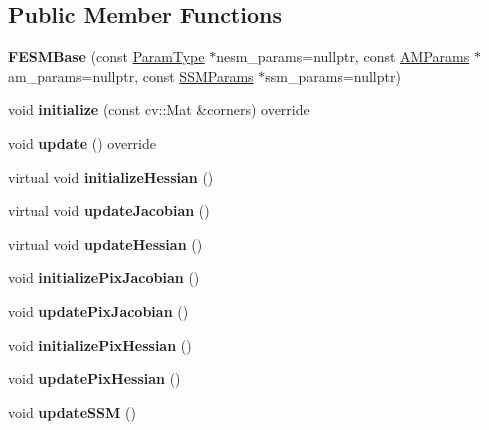 \subsection*{Public Member Functions}
\begin{DoxyCompactItemize}
\item 
\hypertarget{classFESMBase_a6359268e77e5281e263bceec2aa72a30}{{\bfseries F\-E\-S\-M\-Base} (const \hyperlink{structFESMParams}{Param\-Type} $\ast$nesm\-\_\-params=nullptr, const \hyperlink{structAMParams}{A\-M\-Params} $\ast$am\-\_\-params=nullptr, const \hyperlink{structSSMParams}{S\-S\-M\-Params} $\ast$ssm\-\_\-params=nullptr)}\label{classFESMBase_a6359268e77e5281e263bceec2aa72a30}

\item 
\hypertarget{classFESMBase_a8f33c0a97b770ab8c94a18232cfed36b}{void {\bfseries initialize} (const cv\-::\-Mat \&corners) override}\label{classFESMBase_a8f33c0a97b770ab8c94a18232cfed36b}

\item 
\hypertarget{classFESMBase_a49434680fff2e8dc565c635509a37c8a}{void {\bfseries update} () override}\label{classFESMBase_a49434680fff2e8dc565c635509a37c8a}

\item 
\hypertarget{classFESMBase_a0281092da8951b938e6e08e413d8dd95}{virtual void {\bfseries initialize\-Hessian} ()}\label{classFESMBase_a0281092da8951b938e6e08e413d8dd95}

\item 
\hypertarget{classFESMBase_ac67403ec83a42647444af782c6b3f5e6}{virtual void {\bfseries update\-Jacobian} ()}\label{classFESMBase_ac67403ec83a42647444af782c6b3f5e6}

\item 
\hypertarget{classFESMBase_ac1ae6ee31d41ae60419cdc8523d93da8}{virtual void {\bfseries update\-Hessian} ()}\label{classFESMBase_ac1ae6ee31d41ae60419cdc8523d93da8}

\item 
\hypertarget{classFESMBase_a7b3bc0abeb9ee2a5488c637f3abe03dd}{void {\bfseries initialize\-Pix\-Jacobian} ()}\label{classFESMBase_a7b3bc0abeb9ee2a5488c637f3abe03dd}

\item 
\hypertarget{classFESMBase_a72237505f86f83ca2a35a44035f5e9ab}{void {\bfseries update\-Pix\-Jacobian} ()}\label{classFESMBase_a72237505f86f83ca2a35a44035f5e9ab}

\item 
\hypertarget{classFESMBase_ad131b772b18b8a56c4069273d6b3a9e7}{void {\bfseries initialize\-Pix\-Hessian} ()}\label{classFESMBase_ad131b772b18b8a56c4069273d6b3a9e7}

\item 
\hypertarget{classFESMBase_a753139af0c519cb5dd0eeb665351bfc6}{void {\bfseries update\-Pix\-Hessian} ()}\label{classFESMBase_a753139af0c519cb5dd0eeb665351bfc6}

\item 
\hypertarget{classFESMBase_a93e4cd5795659c69f782bd96fd71d2e1}{void {\bfseries update\-S\-S\-M} ()}\label{classFESMBase_a93e4cd5795659c69f782bd96fd71d2e1}

\end{DoxyCompactItemize}

